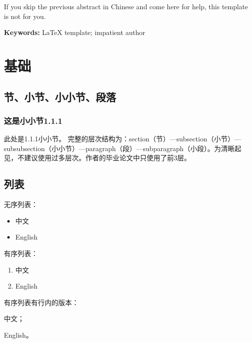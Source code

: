 \documentclass[zihao = -4, linespread = 1.5]{ctexart} %
\begin{document}
\begin{enAbstract}
If you skip the previous abstract in Chinese and come here for help, this template is not for you\smiley{}.
\par\noindent\textbf{Keywords: }\LaTeX{} template; impatient author
\end{enAbstract}

\tableofcontents

\newpage

\section{基础}\label{sec:fundamental}
\subsection{节、小节、小小节、段落}
\subsubsection{这是小小节1.1.1}
此处是1.1.1小小节。
完整的层次结构为：section（节）---subsection（小节）---subsubsection（小小节）---paragraph（段）---subparagraph（小段）。为清晰起见，不建议使用过多层次。作者的毕业论文中只使用了前3层。
\subsection{列表}
无序列表：
\begin{itemize}
  \item 中文
  \item English
\end{itemize}

有序列表：
\begin{enumerate}
  \item 中文
  \item English
\end{enumerate}

有序列表有行内的版本：\begin{enumerate*}[label=(\arabic*)]
\item 中文；
\item English。
\end{enumerate*}
\end{document}

